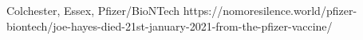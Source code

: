           {Colchester, Essex, }
          {}
          {Pfizer/BioNTech}
          {}
          {
          }
          {https://nomoresilence.world/pfizer-biontech/joe-hayes-died-21st-january-2021-from-the-pfizer-vaccine/}
